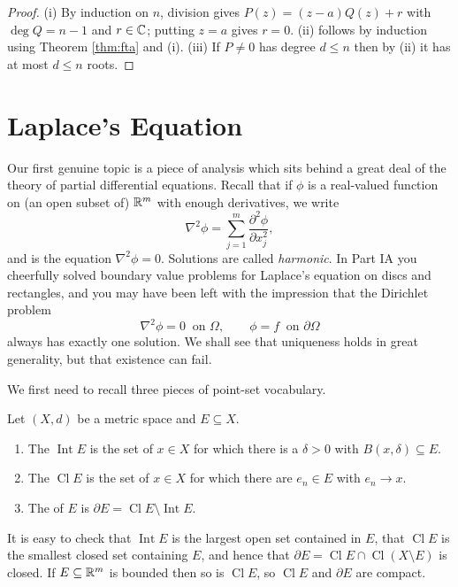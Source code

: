 \documentclass[a4paper]{scrartcl}
\newcommand{\Cl}{\operatorname{Cl}}
\newcommand{\Int}{\operatorname{Int}}
\begin{document}
\begin{proof}
	(i) By induction on $n$, division gives $P(z) = (z-a)Q(z) + r$ with $\deg Q = n-1$ and $r \in \mathbb{C}$; putting $z = a$ gives $r=0$. (ii) follows by induction using Theorem \ref{thm:fta} and (i). (iii) If $P \neq 0$ has degree $d \leq n$ then by (ii) it has at most $d \leq n$ roots.
\end{proof}

\section{Laplace's Equation}

Our first genuine topic is a piece of analysis which sits behind a great deal of the theory of partial differential equations. Recall that if $\phi$ is a real-valued function on (an open subset of) $\mathbb{R}^m$ with enough derivatives, we write
$$\nabla^2 \phi = \sum_{j=1}^m \frac{\partial^2 \phi}{\partial x_j^2},$$
and  is the equation $\nabla^2 \phi = 0$. Solutions are called \emph{harmonic}. In Part IA you cheerfully solved boundary value problems for Laplace's equation on discs and rectangles, and you may have been left with the impression that the Dirichlet problem
$$\nabla^2 \phi = 0 \ \text{ on } \Omega, \qquad \phi = f \ \text{ on } \partial\Omega$$
always has exactly one solution. We shall see that uniqueness holds in great generality, but that existence can fail.

We first need to recall three pieces of point-set vocabulary.

\begin{definition}
	Let $(X,d)$ be a metric space and $E \subseteq X$.
	\begin{enumerate}[label=(\roman*)]
		\item The  $\Int E$ is the set of $x \in X$ for which there is a $\delta>0$ with $B(x,\delta) \subseteq E$.
		\item The  $\Cl E$ is the set of $x \in X$ for which there are $e_n \in E$ with $e_n \to x$.
		\item The  of $E$ is $\partial E = \Cl E \setminus \Int E$.
	\end{enumerate}
\end{definition}

It is easy to check that $\Int E$ is the largest open set contained in $E$, that $\Cl E$ is the smallest closed set containing $E$, and hence that $\partial E = \Cl E \cap \Cl(X \setminus E)$ is closed. If $E \subseteq \mathbb{R}^m$ is bounded then so is $\Cl E$, so $\Cl E$ and $\partial E$ are compact.
\end{document}
